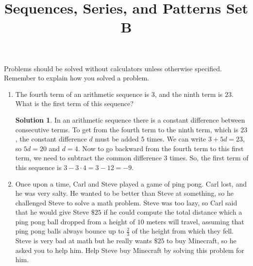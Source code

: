 \documentclass{article}
\title{Sequences, Series, and Patterns Set B}
\date{}
\author{}
\theoremstyle{definition}
\newtheorem*{solution}{Solution}
\begin{document}
    \maketitle
    \noindent Problems should be solved without calculators unless otherwise
    specified. Remember to explain how you solved a problem.
    \begin{enumerate}
        \item The fourth term of an arithmetic sequence is $3$, and the ninth
        term is $23$. What is the first term of this sequence?
        \begin{solution}
            In an arithmetic sequence there is a constant difference between
            consecutive terms. To get from the fourth term to the ninth term,
            which is $23$, the constant difference $d$ must be added $5$ times.
            We can write $3 + 5d = 23$, so $5d = 20$ and $d = 4$. Now to go
            backward from the fourth term to this first term, we need to
            subtract the common difference $3$ times. So, the first term of this
            sequence is $3 - 3 \cdot 4 = 3 - 12 = -9$.
        \end{solution}
        \item Once upon a time, Carl and Steve played a game of ping pong. Carl
        lost, and he was very salty. He wanted to be better than Steve at
        something, so he challenged Steve to solve a math problem. Steve was too
        lazy, so Carl said that he would give Steve $\$25$ if he could compute
        the total distance which a ping pong ball dropped from a height of $10$
        meters will travel, assuming that ping pong balls always bounce up to
        $\frac{2}{3}$ of the height from which they fell. Steve is very bad at
        math but he really wants $\$25$ to buy Minecraft, so he asked you to
        help him. Help Steve buy Minecraft by solving this problem for him.


\end{enumerate}
\end{document}

